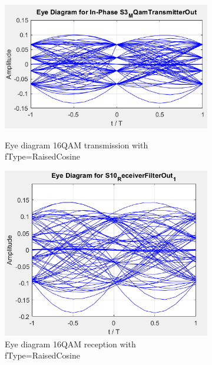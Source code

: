 \begin{figure}[H]
	\centering
        \begin{subfigure}{.55\textwidth}
        \centering
        	\includegraphics[scale=0.55]{./lib/m_qam_transmitter/figure_PLoureiro/16QAM_RaisedCosine_in.png}
        \label{Example_RaisedCoisine_in}\caption{Eye diagram 16QAM transmission with fType=RaisedCosine }
        \end{subfigure}%
        \begin{subfigure}{.55\textwidth}
        \centering
        	\includegraphics[scale=0.45]{./lib/m_qam_transmitter/figure_PLoureiro/16QAM_RaisedCosine_out.png}
        	\caption{Eye diagram 16QAM reception with fType=RaisedCosine }\label{Example_RaisedCoisine_out}
        \end{subfigure}
        \caption{}\label{RaisedCosine}
\end{figure}

